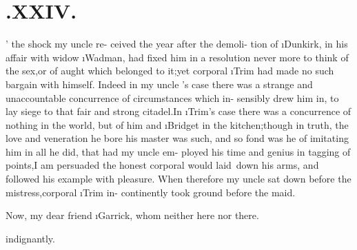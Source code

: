 \documentclass[twoside]{article}
\begin{document}
\section{.\quad  XXIV.}

’ the shock my uncle \toby re-\break
ceived the year after the demoli-\break
tion of \i{Dunkirk}, in his affair with widow \i{Wadman}, had fixed
him in a resolution never more to think of the sex,\tsk or of
aught which belonged to it;\tsk yet corporal \i{Trim} had made
no such bargain with himself. Indeed in my uncle
\toby's case there was a strange and unaccountable
concurrence of circumstances which in-
sensibly drew him in, to lay siege to that\break
fair and strong citadel.\tsh In \i{Trim}’s case\break
there was a concurrence of nothing in the\break
world, but of him and \i{Bridget} in the\break
kitchen;\tsk though in truth, the love and\break
veneration he bore his master was such,\break
and so fond was he of imitating him in\break
all he did, that had my uncle \toby em-\break
ployed his time and genius in tagging of\break
points,\tsh I am persuaded the honest\break
corporal would laid\sic\ down his arms, and\break
followed his example with pleasure.\break
When therefore my uncle \toby sat down\break
before the mistress,\tsk corporal \i{Trim} in-\break
continently took ground before the maid.

Now, my dear friend \i{Garrick}, whom 
neither here nor there.

indignantly.
\end{document}
